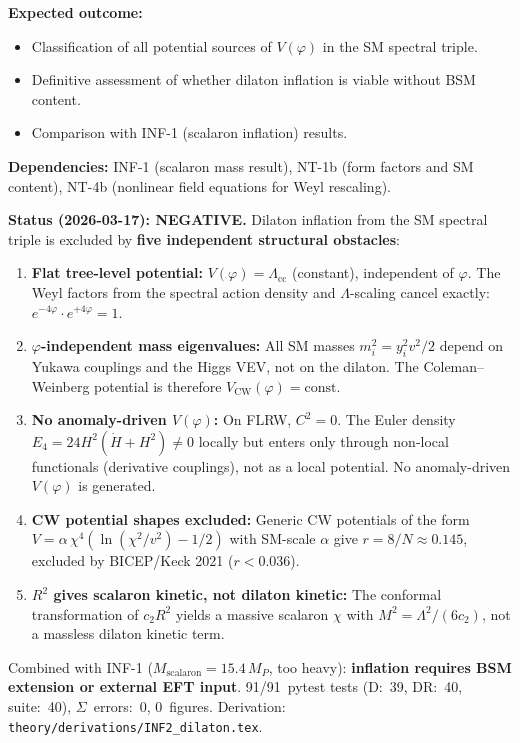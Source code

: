 \documentclass[12pt,a4paper]{article}
\newcommand{\outcome}[1]{\noindent\textbf{Expected outcome:} #1\par}
\newcommand{\deps}[1]{\noindent\textbf{Dependencies:} #1\par}
\begin{document}
\outcome{
\begin{itemize}
  \item Classification of all potential sources of $V(\varphi)$ in
    the SM spectral triple.
  \item Definitive assessment of whether dilaton inflation is viable
    without BSM content.
  \item Comparison with INF-1 (scalaron inflation) results.
\end{itemize}
}

\deps{INF-1 (scalaron mass result), NT-1b (form factors and SM content),
NT-4b (nonlinear field equations for Weyl rescaling).}

\textcolor{long}{\textbf{Status (2026-03-17): NEGATIVE.}}
Dilaton inflation from the SM spectral triple is excluded by
\textbf{five independent structural obstacles}:
\begin{enumerate}[(1)]
  \item \textbf{Flat tree-level potential:} $V(\varphi) = \Lambda_{\text{cc}}$
    (constant), independent of $\varphi$. The Weyl factors from the
    spectral action density and $\Lambda$-scaling cancel exactly:
    $e^{-4\varphi} \cdot e^{+4\varphi} = 1$.
  \item \textbf{$\varphi$-independent mass eigenvalues:} All SM masses
    $m_i^2 = y_i^2 v^2/2$ depend on Yukawa couplings and the Higgs VEV,
    not on the dilaton. The Coleman--Weinberg potential is therefore
    $V_{\text{CW}}(\varphi) = \text{const}$.
  \item \textbf{No anomaly-driven $V(\varphi)$:} On FLRW, $C^2 = 0$.
    The Euler density $E_4 = 24H^2(\dot{H} + H^2) \neq 0$ locally but
    enters only through non-local functionals (derivative couplings),
    not as a local potential. No anomaly-driven $V(\varphi)$ is generated.
  \item \textbf{CW potential shapes excluded:} Generic CW potentials of the
    form $V = \alpha\,\chi^4(\ln(\chi^2/v^2) - 1/2)$ with SM-scale
    $\alpha$ give $r = 8/N \approx 0.145$, excluded by BICEP/Keck 2021
    ($r < 0.036$).
  \item \textbf{$R^2$ gives scalaron kinetic, not dilaton kinetic:}
    The conformal transformation of $c_2 R^2$ yields a massive scalaron
    $\chi$ with $M^2 = \Lambda^2/(6c_2)$, not a massless dilaton kinetic
    term.
\end{enumerate}
Combined with INF-1 ($M_{\text{scalaron}} = 15.4\,M_P$, too heavy):
\textbf{inflation requires BSM extension or external EFT input}.
91/91~pytest tests (D:~39, DR:~40, suite:~40), $\Sigma$~errors:~0, 0~figures.
Derivation: \texttt{theory/derivations/INF2\_dilaton.tex}.
\end{document}
